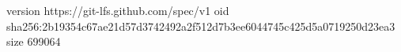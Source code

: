 version https://git-lfs.github.com/spec/v1
oid sha256:2b19354c67ae21d57d3742492a2f512d7b3ee6044745c425d5a0719250d23ea3
size 699064
